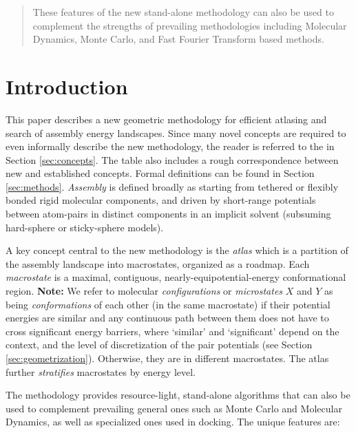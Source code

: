 \documentclass[]{article}
\newcommand{\rahul}[1]{\color{black}{#1}\color{black}}
\begin{document}
\begin{abstract}
{These features of the new stand-alone methodology can also be used to 
complement the strengths of prevailing methodologies including Molecular 
Dynamics, Monte Carlo, and Fast Fourier Transform based methods.
}
\end{abstract}

 
\section{Introduction} 
\label{sec:intro}
This paper describes a new geometric methodology for efficient atlasing and
search of assembly energy landscapes. Since many novel concepts are required to
even informally describe the new methodology, the reader is referred to the
\rahul{Table \ref{tab:terminology} } in Section \ref{sec:concepts}. The table
also includes a rough correspondence between new and established concepts.
Formal definitions can be found in Section \ref{sec:methods}. \emph{Assembly}
is defined broadly as starting from tethered or flexibly bonded rigid molecular
components, and driven by short-range potentials between atom-pairs in distinct
components in an implicit solvent (subsuming hard-sphere or sticky-sphere
models). 

A key concept central to the new methodology is the \emph{atlas} which is a
partition of the assembly landscape into macrostates, organized as a roadmap.
Each \emph{macrostate} is a maximal, contiguous, nearly-equipotential-energy
conformational region. {\bf Note:} We refer to molecular \emph{configurations}
or \emph{microstates} $X$ and $Y$ as being \emph{conformations} of each other
(in the same macrostate) if their potential energies are similar and any
continuous path between them does not have to cross significant energy
barriers, where `similar' and `significant' depend on the context, and the
level of discretization of the pair potentials (see Section
\ref{sec:geometrization}). Otherwise, they are in different macrostates. The
atlas further \emph{stratifies} macrostates by energy level.

The methodology provides resource-light, stand-alone algorithms that can also
be used to complement prevailing general ones such as Monte Carlo and Molecular
Dynamics, as well as specialized ones used in docking. The unique features are:
\end{document}
